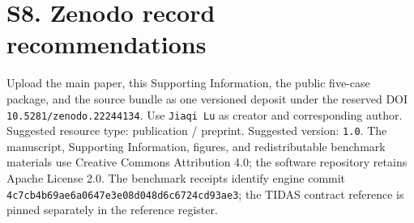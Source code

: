 \documentclass[
  10pt,
  a4paper,
  DIV=11,
  numbers=noendperiod]{scrartcl}
\begin{document}
\section{S8. Zenodo record
recommendations}\label{s8.-zenodo-record-recommendations}

Upload the main paper, this Supporting Information, the public five-case
package, and the source bundle as one versioned deposit under the
reserved DOI \texttt{10.5281/zenodo.22244134}. Use \texttt{Jiaqi\ Lu} as
creator and corresponding author. Suggested resource type: publication /
preprint. Suggested version: \texttt{1.0}. The manuscript, Supporting
Information, figures, and redistributable benchmark materials use
Creative Commons Attribution 4.0; the software repository retains
Apache License 2.0. The benchmark receipts identify engine commit
\texttt{4c7cb4b69ae6a0647e3e08d048d6c6724cd93ae3}; the TIDAS contract
reference is pinned separately in the reference register.
\end{document}
